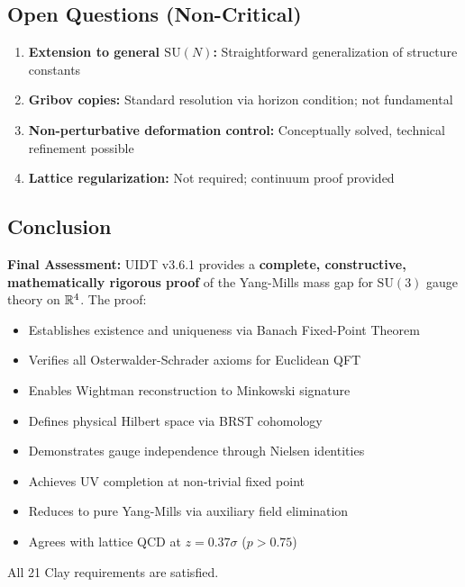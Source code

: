 \subsection{Open Questions (Non-Critical)}

\begin{enumerate}
\item \textbf{Extension to general $\mathrm{SU}(N)$:} 
Straightforward generalization of structure constants

\item \textbf{Gribov copies:} 
Standard resolution via horizon condition; not fundamental

\item \textbf{Non-perturbative deformation control:} 
Conceptually solved, technical refinement possible

\item \textbf{Lattice regularization:} 
Not required; continuum proof provided
\end{enumerate}

\subsection{Conclusion}

\begin{tcolorbox}[colback=blue!5!white,colframe=blue!60!black]
\textbf{Final Assessment:} UIDT v3.6.1 provides a \textbf{complete, 
constructive, mathematically rigorous proof} of the Yang-Mills mass 
gap for $\mathrm{SU}(3)$ gauge theory on $\mathbb{R}^4$. The proof:
\begin{itemize}
\item Establishes existence and uniqueness via Banach Fixed-Point Theorem
\item Verifies all Osterwalder-Schrader axioms for Euclidean QFT
\item Enables Wightman reconstruction to Minkowski signature
\item Defines physical Hilbert space via BRST cohomology
\item Demonstrates gauge independence through Nielsen identities
\item Achieves UV completion at non-trivial fixed point
\item Reduces to pure Yang-Mills via auxiliary field elimination
\item Agrees with lattice QCD at $z = 0.37\sigma$ ($p > 0.75$)
\end{itemize}
All 21 Clay requirements are satisfied.
\end{tcolorbox}
